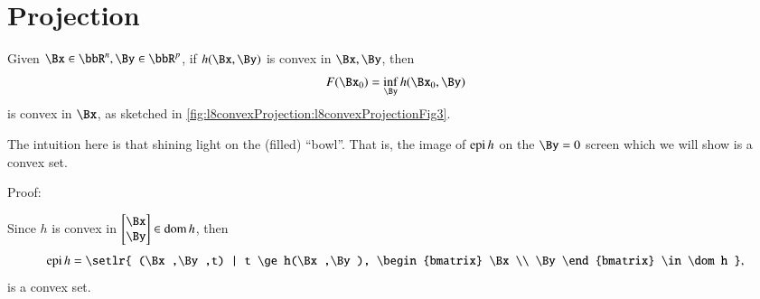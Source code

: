 %
%

\section{Projection}

Given \( \Bx \in \bbR^n, \By \in \bbR^p \), if \( h(\Bx,\By) \) is convex in \( \Bx, \By \), then
%
\begin{equation}\label{eqn:convexOptimizationLecture8:60}
F(\Bx_0) = \inf_\By h(\Bx_0,\By)
\end{equation}
%
is convex in \( \Bx\), as sketched in \cref{fig:l8convexProjection:l8convexProjectionFig3}.


The intuition here is that shining light on the (filled) ``bowl''.  That is, the image of \( \operatorname{epi} h \) on the \( \By = 0 \) screen which we will show is a convex set.

Proof:

Since \( h \) is convex in \( \begin{bmatrix} \Bx \\ \By \end{bmatrix} \in \dom h \), then
%
\begin{equation}\label{eqn:convexOptimizationLecture8:80}
\epi h = \setlr{ (\Bx,\By,t) | t \ge h(\Bx,\By), \begin{bmatrix} \Bx \\ \By \end{bmatrix} \in \dom h },
\end{equation}
%
is a convex set.

